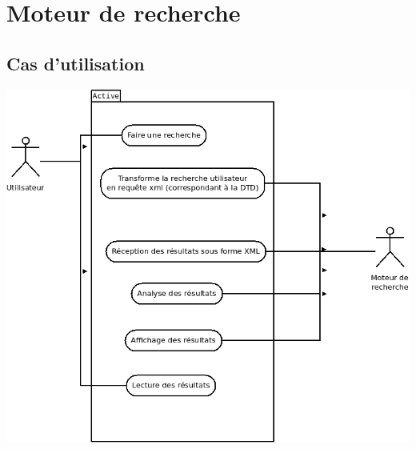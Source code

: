 \section{Moteur de recherche}

\subsection{Cas d'utilisation}\label{utilisation-recherche}
\begin{center}
\includegraphics[scale=0.55]{"images/cas_utilisation_recherche"}
\end{center}

